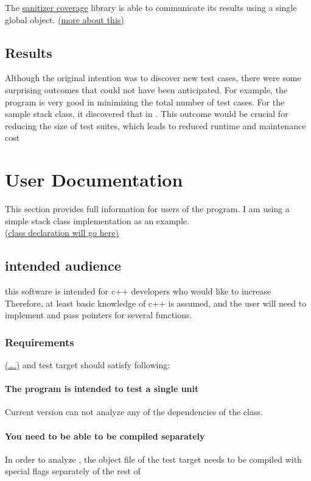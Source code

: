 \documentclass{elteikthesis}[2018/06/06]
\begin{document}
The \uline{sanitizer coverage} library is able to communicate its results using a single global object. \uline{(more about this)}  \\
\section{Results}
\label{sec-1-4}
Although the original intention was to discover new test cases, there were some surprising outcomes that could not have been anticipated. For example, the program is very good in minimizing the total number of test cases. For the sample stack class, it discovered that in . This outcome would be crucial for reducing the size of test suites, which leads to reduced runtime and maintenance cost \\
\chapter{User Documentation}
\label{sec-2}
This section provides full information for users of the program. I am using a simple stack class implementation as an example. \\
\uline{(class declaration will go here)} \\
\section{intended audience}
\label{sec-2-1}
this software is intended for c++ developers who would like to increase \\
Therefore, at least basic knowledge of c++ is assumed, and the user will need to implement and pass pointers for several functions. \\
\subsection{Requirements}
\label{sec-2-1-1}
\uline{(\ldots{}.)} and test target should satisfy following: \\
\subsubsection{The program is intended to test a single unit}
\label{sec-2-1-1-1}
Current version can not analyze any of the dependencies of the class. \\
\subsubsection{You need to be able to be compiled separately}
\label{sec-2-1-1-2}
In order to analyze , the object file of the test target needs to be compiled with special flags separately of the rest of \\
\end{document}
